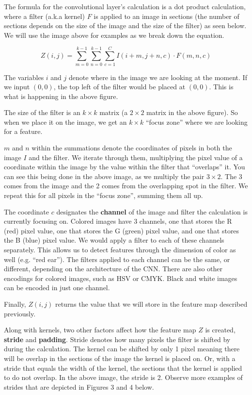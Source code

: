         The formula for the convolutional layer's calculation is a dot product calculation, where a filter (a.k.a kernel) $F$ is applied to an image in sections (the number of sections depends on the size of the image and the size of the filter) as seen below. We will use the image above for examples as we break down the equation.
        
        $$Z(i, j) = \sum^{k-1}_{m=0} \sum^{k-1}_{n=0} \sum^{C}_{c=1}  I(i+m, j+n, c) \cdot F(m, n, c) $$
        
        The variables $i$ and $j$ denote where in the image we are looking at the moment. If we input $(0,0)$, the top left of the filter would be placed at $(0,0)$. This is what is happening in the above figure. \break
        
        The size of the filter is an $k \times k$ matrix (a $2 
        \times 2$ matrix in the above figure). So when we place it on the image, we get an $k \times k$ ``focus zone'' where we are looking for a feature. \break
        
        $m$ and $n$ within the summations denote the coordinates of pixels in both the image $I$ and the filter. We iterate through them, multiplying the pixel value of a coordinate within the image by the value within the filter that ``overlaps'' it. You can see this being done in the above image, as we multiply the pair $3 \times 2$. The 3 comes from the image and the 2 comes from the overlapping spot in the filter. We repeat this for all pixels in the ``focus zone'', summing them all up.\break
        
        The coordinate $c$ designates the \textbf{channel} of the image and filter the calculation is currently focusing on. Colored images have 3 channels, one that stores the R (red) pixel value, one that stores the G (green) pixel value, and one that stores the B (blue) pixel value. We would apply a filter to each of these channels separately. This allows us to detect features through the dimension of color as well (e.g. ``red ear''). The filters applied to each channel can be the same, or different, depending on the architecture of the CNN. There are also other encodings for colored images, such as HSV or CMYK. Black and white images can be encoded in just one channel.\break
        
        Finally, $Z(i,j)$ returns the value  that we will store in the feature map described previously. \break

        Along with kernels, two other factors affect how the feature map $Z$ is created, \textbf{stride} and \textbf{padding}. Stride denotes how many pixels the filter is shifted by during the calculation. The kernel can be shifted by only 1 pixel meaning there will be overlap in the sections of the image the kernel is placed on. Or, with a stride that equals the width of the kernel, the sections that the kernel is applied to do not overlap. In the above image, the stride is 2. Observe more examples of strides that are depicted in Figures 3 and 4 below. 

